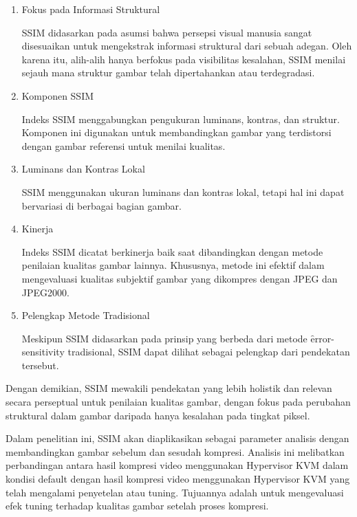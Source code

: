 \begin{enumerate}
	\item Fokus pada Informasi Struktural
	
	SSIM didasarkan pada asumsi bahwa persepsi visual manusia sangat disesuaikan untuk mengekstrak informasi struktural dari sebuah adegan. Oleh karena itu, alih-alih hanya berfokus pada visibilitas kesalahan, SSIM menilai sejauh mana struktur gambar telah dipertahankan atau terdegradasi\cite{Wang2004}.
	
	\item Komponen SSIM
	
	Indeks SSIM menggabungkan pengukuran luminans, kontras, dan struktur. Komponen ini digunakan untuk membandingkan gambar yang terdistorsi dengan gambar referensi untuk menilai kualitas\cite{Wang2004}.
	
	\item Luminans dan Kontras Lokal
	
	SSIM menggunakan ukuran luminans dan kontras lokal, tetapi hal ini dapat bervariasi di berbagai bagian gambar\cite{Wang2004}.
	
	\item Kinerja
	
	Indeks SSIM dicatat berkinerja baik saat dibandingkan dengan metode penilaian kualitas gambar lainnya. Khususnya, metode ini efektif dalam mengevaluasi kualitas subjektif gambar yang dikompres dengan JPEG dan JPEG2000\cite{Wang2004}.
	
	\item Pelengkap Metode Tradisional
	
	Meskipun SSIM didasarkan pada prinsip yang berbeda dari metode \f{error-sensitivity} tradisional, SSIM dapat dilihat sebagai pelengkap dari pendekatan tersebut\cite{Wang2004}.
\end{enumerate}

Dengan demikian, SSIM mewakili pendekatan yang lebih holistik dan relevan secara perseptual untuk penilaian kualitas gambar, dengan fokus pada perubahan struktural dalam gambar daripada hanya kesalahan pada tingkat piksel.

Dalam penelitian ini, SSIM akan diaplikasikan sebagai parameter analisis dengan membandingkan gambar sebelum dan sesudah kompresi. Analisis ini melibatkan perbandingan antara hasil kompresi video menggunakan Hypervisor KVM dalam kondisi default dengan hasil kompresi video menggunakan Hypervisor KVM yang telah mengalami penyetelan atau tuning. Tujuannya adalah untuk mengevaluasi efek tuning terhadap kualitas gambar setelah proses kompresi.


